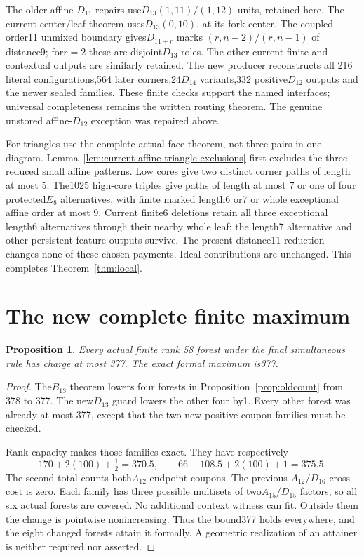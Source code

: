 \documentclass[11pt]{article}
\newtheorem{proposition}[theorem]{Proposition}
\theoremstyle{remark}\newtheorem{remark}[theorem]{Remark}
\begin{document}
The older affine-$D_{11}$ repairs use$D_{13}(1,11)/(1,12)$ units, retained
here. The current center/leaf theorem uses$D_{13}(0,10)$, at its fork
center. The coupled order11 unmixed boundary gives$D_{11+r}$ marks
$(r,n-2)/(r,n-1)$ of distance9; for$r=2$ these are disjoint$D_{13}$ roles.
The other current finite and contextual outputs are similarly retained.
The new producer reconstructs all 216 literal configurations,564 later
corners,24$D_{14}$ variants,332 positive$D_{12}$ outputs and the newer
sealed families. These finite checks support the named interfaces;
universal completeness remains the written routing theorem. The genuine
unstored affine-$D_{12}$ exception was repaired above.

For triangles use the complete actual-face theorem, not three pairs in
one diagram. Lemma~\ref{lem:current-affine-triangle-exclusions} first
excludes the three reduced small affine patterns. Low cores give two
distinct corner paths of length at most 5.
The1025 high-core triples give paths of length at most 7 or one of four
protected$E_8$ alternatives, with finite marked length6 or7 or whole
exceptional affine order at most 9. Current finite6 deletions retain all
three exceptional length6 alternatives through their nearby whole leaf;
the length7 alternative and other persistent-feature outputs survive.
The present distance11 reduction changes none of these chosen payments.
Ideal contributions are unchanged. This completes
Theorem~\ref{thm:local}.

\section{The new complete finite maximum}
\begin{proposition}\label{prop:finite}
Every actual finite rank 58 forest under the final simultaneous rule has
charge at most 377. The exact formal maximum is377.
\end{proposition}
\begin{proof}
The$B_{13}$ theorem lowers four forests in Proposition~\ref{prop:oldcount}
from 378 to 377. The new$D_{13}$ guard lowers the other four by1. Every
other forest was already at most 377, except that the two new positive
coupon families must be checked.

Rank capacity makes those families exact. They have respectively
\[
 170+2(100)+\tfrac12=370.5,
 \qquad66+108.5+2(100)+1=375.5.
\]
The second total counts both$A_{12}$ endpoint coupons. The previous
$A_{12}/D_{16}$ cross cost is zero. Each family has three possible
multisets of two$A_{15}/D_{15}$ factors, so all six actual forests are
covered. No additional context witness can fit. Outside them the change
is pointwise nonincreasing. Thus the bound377 holds everywhere, and the
eight changed forests attain it formally. A geometric realization of an
attainer is neither required nor asserted.
\end{proof}
\end{document}
